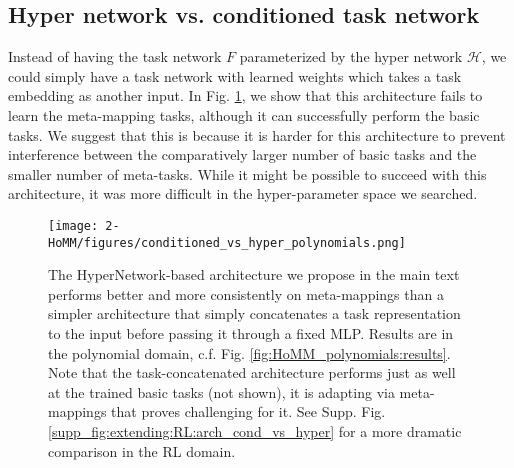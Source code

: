 \subsection{Hyper network vs. conditioned task network} \label{app_lesion_results_hyper}
Instead of having the task network $F$ parameterized by the hyper network $\mathcal{H}$, we could simply have a task network with learned weights which takes a task embedding as another input. In Fig. \ref{supp_fig:HoMM_arch_cond_vs_hyper}, we show that this architecture fails to learn the meta-mapping tasks, although it can successfully perform the basic tasks. We suggest that this is because it is harder for this architecture to prevent interference between the comparatively larger number of basic tasks and the smaller number of meta-tasks. While it might be possible to succeed with this architecture, it was more difficult in the hyper-parameter space we searched.\par 

\begin{figure}[H]
\centering
\texttt{[image: 2-HoMM/figures/conditioned\_vs\_hyper\_polynomials.png]}
\caption[The HyperNetwork-based architecture we propose outperforms a simpler architecture.]{The HyperNetwork-based architecture we propose in the main text performs better and more consistently on meta-mappings than a simpler architecture that simply concatenates a task representation to the input before passing it through a fixed MLP. Results are in the polynomial domain, c.f. Fig. \ref{fig:HoMM_polynomials:results}. Note that the task-concatenated architecture performs just as well at the trained basic tasks (not shown), it is adapting via meta-mappings that proves challenging for it. See Supp. Fig. \ref{supp_fig:extending:RL:arch_cond_vs_hyper} for a more dramatic comparison in the RL domain. }\label{supp_fig:HoMM_arch_cond_vs_hyper}
\end{figure}

